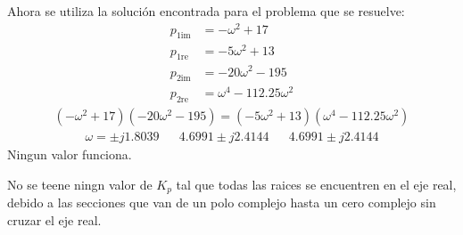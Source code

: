 \begin{itemize}
  Ahora se utiliza la solución encontrada para el problema que se resuelve:
  \begin{align*}
    p_{1\text{im}} &=-\omega^2+17
    \\
    p_{1\text{re}} &=-5\omega^2+13
    \\
    p_{2\text{im}} &=-20\omega^2 -195
    \\
    p_{2\text{re}} &=\omega^4 - 112.25 \omega^2
  \end{align*}
  \begin{align*}
    (-\omega^2+17)(-20\omega^2 -195) = (-5\omega^2+13)(\omega^4 - 112.25 \omega^2)
  \end{align*}
  \begin{align*}
    \omega = \pm j1.8039 && 4.6991 \pm j2.4144 && 4.6991 \pm j2.4144
  \end{align*}
  Ningun valor funciona.

  No se teene ningn valor de $K_p$ tal que todas las raices se encuentren en el eje real, debido a las secciones que van de un polo complejo hasta un cero complejo sin cruzar el eje real.

\end{itemize}
